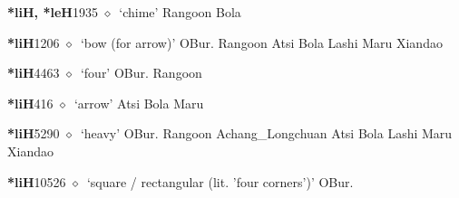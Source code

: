   \begin{list}{}{\leftmargin=1.5em \itemindent=-1.5em}
  \item {\footnotesize \textbf{*liH, *leH}}{\tiny 1935}
         $\diamond$~`chime'
         Rangoon 
\hspace{1ex}
         Bola 
  \item {\footnotesize \textbf{*liH}}{\tiny 1206}
\hspace{1ex}
         $\diamond$~`bow (for arrow)'
         OBur. 
\hspace{1ex}
         Rangoon 
\hspace{1ex}
         Atsi 
\hspace{1ex}
         Bola 
\hspace{1ex}
         Lashi 
\hspace{1ex}
         Maru 
\hspace{1ex}
         Xiandao 
  \item {\footnotesize \textbf{*liH}}{\tiny 4463}
\hspace{1ex}
         $\diamond$~`four'
         OBur. 
\hspace{1ex}
         Rangoon 
  \item {\footnotesize \textbf{*liH}}{\tiny 416}
\hspace{1ex}
         $\diamond$~`arrow'
         Atsi 
\hspace{1ex}
         Bola 
\hspace{1ex}
         Maru 
  \item {\footnotesize \textbf{*liH}}{\tiny 5290}
\hspace{1ex}
         $\diamond$~`heavy'
         OBur. 
\hspace{1ex}
         Rangoon 
\hspace{1ex}
         Achang\_Longchuan 
\hspace{1ex}
         Atsi 
\hspace{1ex}
         Bola 
\hspace{1ex}
         Lashi 
\hspace{1ex}
         Maru 
\hspace{1ex}
         Xiandao 
  \item {\footnotesize \textbf{*liH}}{\tiny 10526}
\hspace{1ex}
         $\diamond$~`square / rectangular (lit. 'four corners')'
         OBur. 
  \end{list}
